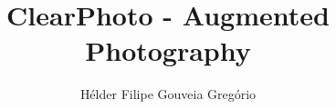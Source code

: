 \documentclass[msc,en,
twoside,11pt,utf8,a4paper,
]{thesisdifctunl}
\title{ClearPhoto - Augmented Photography}
\author[m]{Hélder Filipe Gouveia Gregório}
\begin{document}
\frontmatter

\frontpage

\printcopyright

\printdedicatory

\printacknowledgements

\printquote

\printabstract

\tableofcontents 

\printotherlists 

\printchapthers

\printbib

\printappendixes 

\end{document}
